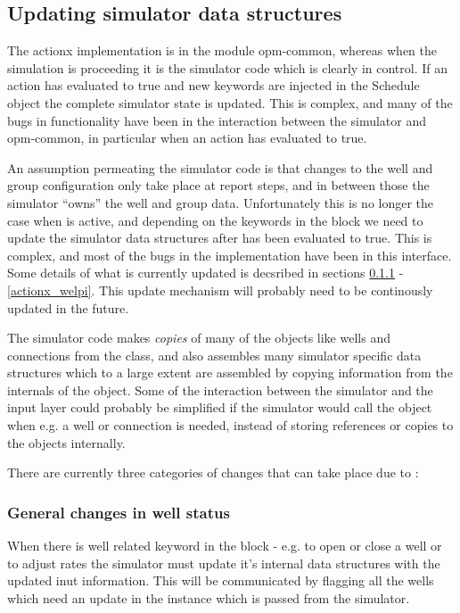 \subsection{Updating simulator data structures}
The actionx implementation is in the module opm-common, whereas when the
simulation is proceeding it is the simulator code which is clearly in control.
If an action has evaluated to true and new keywords are injected in the Schedule
object the complete simulator state is updated. This is complex, and many of the
bugs in \actionx{} functionality have been in the interaction between the
simulator and opm-common, in particular when an action has evaluated to true.

An assumption permeating the simulator code is that changes to the well and
group configuration only take place at report steps, and in between those the
simulator ``owns'' the well and group data. Unfortunately this is no longer the
case when \actionx{} is active, and depending on the keywords in the \actionx{}
block we need to update the simulator data structures after \actionx{} has been
evaluated to true. This is complex, and most of the bugs in the \actionx{}
implementation have been in this interface. Some details of what is currently
updated is decsribed in sections \ref{actionx_change_well} -
\ref{actionx_welpi}. This update mechanism will probably need to be continously
updated in the future.

The simulator code makes \emph{copies} of many of the objects like wells and
connections from the  class, and also assembles many
simulator specific data structures which to a large extent are assembled by
copying information from the internals of the  object. Some
of the interaction between the simulator and the input layer could probably be
simplified if the simulator would call the  object when
e.g. a well or connection is needed, instead of storing references or copies to
the  objects internally.

There are currently three categories of changes that can take place due to
\actionx{}:


\subsubsection{General changes in well status}
\label{actionx_change_well}
When there is well related keyword in the \actionx{} block - e.g. 
to open or close a well or  to adjust rates the simulator must
update it's internal data structures with the updated inut information. This
will be communicated by flagging all the wells which need an update in the
 instance which is passed from the
simulator.



